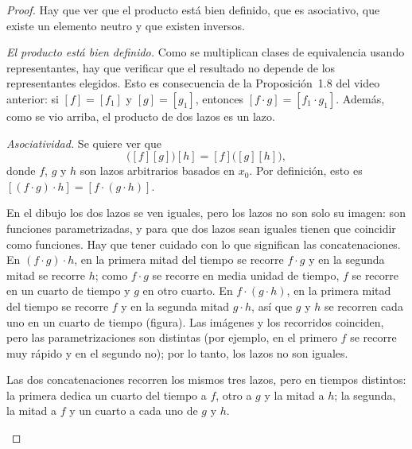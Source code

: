 \documentclass[11pt]{article}
\begin{document}
\begin{proof}
Hay que ver que el producto está bien definido, que es asociativo, que existe un elemento neutro y que existen inversos.

\medskip\noindent\textit{El producto está bien definido.}
Como se multiplican clases de equivalencia usando representantes, hay que verificar que el resultado no depende de los representantes elegidos. Esto es consecuencia de la Proposición~1.8 del video anterior: si $[f]=[f_1]$ y $[g]=[g_1]$, entonces $[f\cdot g]=[f_1\cdot g_1]$. Además, como se vio arriba, el producto de dos lazos es un lazo.

\medskip\noindent\textit{Asociatividad.}
Se quiere ver que
\[
  \bigl([f][g]\bigr)[h]=[f]\bigl([g][h]\bigr),
\]
donde $f$, $g$ y $h$ son lazos arbitrarios basados en $x_0$. Por definición, esto es $[(f\cdot g)\cdot h]=[f\cdot(g\cdot h)]$.

En el dibujo los dos lazos se ven iguales, pero los lazos no son solo su imagen: son funciones parametrizadas, y para que dos lazos sean iguales tienen que coincidir como funciones. Hay que tener cuidado con lo que significan las concatenaciones. En $(f\cdot g)\cdot h$, en la primera mitad del tiempo se recorre $f\cdot g$ y en la segunda mitad se recorre $h$; como $f\cdot g$ se recorre en media unidad de tiempo, $f$ se recorre en un cuarto de tiempo y $g$ en otro cuarto. En $f\cdot(g\cdot h)$, en la primera mitad del tiempo se recorre $f$ y en la segunda mitad $g\cdot h$, así que $g$ y $h$ se recorren cada uno en un cuarto de tiempo (figura). Las imágenes y los recorridos coinciden, pero las parametrizaciones son distintas (por ejemplo, en el primero $f$ se recorre muy rápido y en el segundo no); por lo tanto, los lazos no son iguales.

\begin{center}
\par\smallskip
\begin{minipage}{0.9\textwidth}\small\centering
Las dos concatenaciones recorren los mismos tres lazos, pero en tiempos distintos: la primera dedica un cuarto del tiempo a $f$, otro a $g$ y la mitad a $h$; la segunda, la mitad a $f$ y un cuarto a cada uno de $g$ y $h$.
\end{minipage}
\end{center}


\end{proof}
\end{document}
